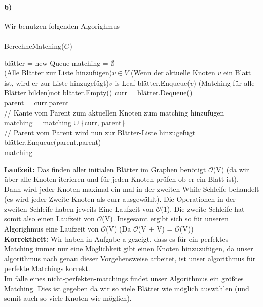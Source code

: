 \documentclass[a4paper]{article}
\def\Oh{\ensuremath{\mathcal{O}}} %
\begin{document}
\paragraph{b)}
Wir benutzen folgenden Algorighmus \\ \\
\noindent BerechneMatching($G$)\\
\begin{algorithm}[H]
    blätter = new Queue
    matching = $\emptyset$ \\
    \ForEach(Alle Blätter zur Liste hinzufügen){$v \in V$}{
        \If(Wenn der aktuelle Knoten $v$ ein Blatt ist, wird er
        zur Liste hinzugefügt){$v$ is Leaf}{
            blätter.Enqueue($v$)
        }
    }
    \While(Matching für alle Blätter bilden){not blätter.Empty()}{
        curr = blätter.Dequeue() \\
        parent = curr.parent \\
        // Kante vom Parent zum aktuellen Knoten zum matching hinzufügen \\
        matching = matching $\cup$ \{curr, parent\} \\
        // Parent vom Parent wird nun zur Blätter-Liste hinzugefügt \\
        blätter.Enqueue(parent.parent) \\
    }
    \Return matching \\
\end{algorithm}
\noindent\textbf{Laufzeit:} Das finden aller initialen Blätter im Graphen benötigt \Oh(V) (da wir
über alle Knoten iterieren und für jeden Knoten prüfen ob er ein Blatt ist). \\
Dann wird jeder Knoten maximal ein mal in der zweiten While-Schleife behandelt (es wird
jeder Zweite Knoten als curr ausgewählt). Die Operationen in der zweiten Schleife haben jeweils
Eine Laufzeit von \Oh(1). Die zweite Schleife hat somit also einen Laufzeit von \Oh(V). 
Insgesamt ergibt sich so für unseren Algorighmus eine Laufzeit von \Oh(V) (Da \Oh(V + V) = \Oh(V)) \\
\textbf{Korrektheit:}
Wir haben in Aufgabe a gezeigt, dass es für ein perfektes Matching immer nur eine Möglichkeit
gibt einen Knoten hinzuzufügen, da unser algorithmus nach genau dieser Vorgehensweise arbeitet,
ist unser algorithmus für perfekte Matchings korrekt. \\
Im falle eines nicht-perfekten-matchings findet unser Algorithmus ein größtes Matching. Dies
ist gegeben da wir so viele Blätter wie möglich auswählen (und somit auch so viele Knoten
wie möglich). 
\end{document}
